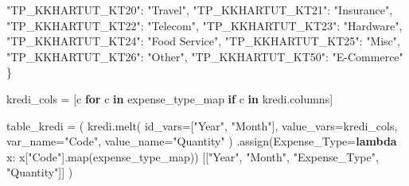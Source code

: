 \documentclass[
  11pt,
  a4paper,
  DIV=11,
  numbers=noendperiod]{scrartcl}
\newenvironment{Shaded}{\begin{snugshade}}{\end{snugshade}}
\newcommand{\BuiltInTok}[1]{\textcolor[rgb]{0.00,0.23,0.31}{#1}}
\newcommand{\ControlFlowTok}[1]{\textcolor[rgb]{0.00,0.23,0.31}{\textbf{#1}}}
\newcommand{\KeywordTok}[1]{\textcolor[rgb]{0.00,0.23,0.31}{\textbf{#1}}}
\newcommand{\NormalTok}[1]{\textcolor[rgb]{0.00,0.23,0.31}{#1}}
\newcommand{\OperatorTok}[1]{\textcolor[rgb]{0.37,0.37,0.37}{#1}}
\newcommand{\StringTok}[1]{\textcolor[rgb]{0.13,0.47,0.30}{#1}}
\begin{document}
\begin{Shaded}
\begin{Highlighting}[]
    \StringTok{"TP\_KKHARTUT\_KT20"}\NormalTok{: }\StringTok{"Travel"}\NormalTok{,}
    \StringTok{"TP\_KKHARTUT\_KT21"}\NormalTok{: }\StringTok{"Insurance"}\NormalTok{,}
    \StringTok{"TP\_KKHARTUT\_KT22"}\NormalTok{: }\StringTok{"Telecom"}\NormalTok{,}
    \StringTok{"TP\_KKHARTUT\_KT23"}\NormalTok{: }\StringTok{"Hardware"}\NormalTok{,}
    \StringTok{"TP\_KKHARTUT\_KT24"}\NormalTok{: }\StringTok{"Food Service"}\NormalTok{,}
    \StringTok{"TP\_KKHARTUT\_KT25"}\NormalTok{: }\StringTok{"Misc"}\NormalTok{,}
    \StringTok{"TP\_KKHARTUT\_KT26"}\NormalTok{: }\StringTok{"Other"}\NormalTok{,}
    \StringTok{"TP\_KKHARTUT\_KT50"}\NormalTok{: }\StringTok{"E{-}Commerce"}
\NormalTok{\}}

\NormalTok{kredi\_cols }\OperatorTok{=}\NormalTok{ [c }\ControlFlowTok{for}\NormalTok{ c }\KeywordTok{in}\NormalTok{ expense\_type\_map }\ControlFlowTok{if}\NormalTok{ c }\KeywordTok{in}\NormalTok{ kredi.columns]}

\NormalTok{table\_kredi }\OperatorTok{=}\NormalTok{ (}
\NormalTok{    kredi.melt(}
\NormalTok{        id\_vars}\OperatorTok{=}\NormalTok{[}\StringTok{"Year"}\NormalTok{, }\StringTok{"Month"}\NormalTok{],}
\NormalTok{        value\_vars}\OperatorTok{=}\NormalTok{kredi\_cols,}
\NormalTok{        var\_name}\OperatorTok{=}\StringTok{"Code"}\NormalTok{,}
\NormalTok{        value\_name}\OperatorTok{=}\StringTok{"Quantity"}
\NormalTok{    )}
\NormalTok{    .assign(Expense\_Type}\OperatorTok{=}\KeywordTok{lambda}\NormalTok{ x: x[}\StringTok{"Code"}\NormalTok{].}\BuiltInTok{map}\NormalTok{(expense\_type\_map))}
\NormalTok{    [[}\StringTok{"Year"}\NormalTok{, }\StringTok{"Month"}\NormalTok{, }\StringTok{"Expense\_Type"}\NormalTok{, }\StringTok{"Quantity"}\NormalTok{]]}
\NormalTok{)}


\end{Highlighting}
\end{Shaded}
\end{document}
